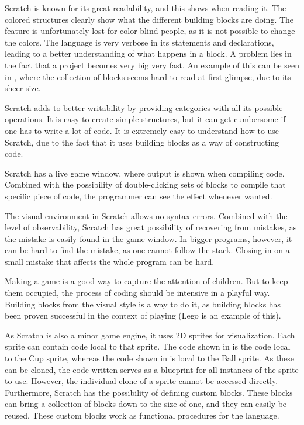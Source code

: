 \begin{description}[style=nextline]
\item[Readability] Scratch is known for its great readability, and this shows when reading it. The colored structures clearly show what the different building blocks are doing. The feature is unfortunately lost for color blind people, as it is not possible to change the colors. The language is very verbose in its statements and declarations, leading to a better understanding of what happens in a block. A problem lies in the fact that a project becomes very big very fast. An example of this can be seen in , where the collection of blocks seems hard to read at first glimpse, due to its sheer size.
\item[Writability] Scratch adds to better writability by providing categories with all its possible operations. It is easy to create simple structures, but it can get cumbersome if one has to write a lot of code. It is extremely easy to understand how to use Scratch, due to the fact that it uses building blocks as a way of constructing code.
\item[Observability] Scratch has a live game window, where output is shown when compiling code. Combined with the possibility of double-clicking sets of blocks to compile that specific piece of code, the programmer can see the effect whenever wanted.
\item[Trialability] The visual environment in Scratch allows no syntax errors. Combined with the level of observability, Scratch has great possibility of recovering from mistakes, as the mistake is easily found in the game window. In bigger programs, however, it can be hard to find the mistake, as one cannot follow the stack. Closing in on a small mistake that affects the whole program can be hard.
\item[Learnability] Making a game is a good way to capture the attention of children. But to keep them occupied, the process of coding should be intensive in a playful way. Building blocks from the visual style is a way to do it, as building blocks has been proven successful in the context of playing (Lego is an example of this).
\item[Reusability] As Scratch is also a minor game engine, it uses 2D sprites for visualization. Each sprite can contain code local to that sprite. The code shown in  is the code local to the Cup sprite, whereas the code shown in  is local to the Ball sprite. As these can be cloned, the code written serves as a blueprint for all instances of the sprite to use. However, the individual clone of a sprite cannot be accessed directly. Furthermore, Scratch has the possibility of defining custom blocks. These blocks can bring a collection of blocks down to the size of one, and they can easily be reused. These custom blocks work as functional procedures for the language.

\end{description}
